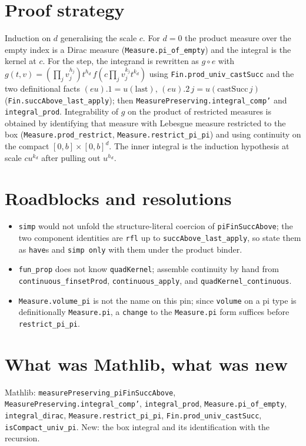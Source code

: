 \documentclass[11pt]{article}
\begin{document}
\section{Proof strategy}
Induction on $d$ generalising the scale $c$. For $d=0$ the product measure over the empty index is a
Dirac measure (\texttt{Measure.pi\_of\_empty}) and the integral is the kernel at $c$. For the step,
the integrand is rewritten as $g\circ e$ with $g(t,v)=(\prod_jv_j^{h_j})t^{h_d}\,f(c\prod_jv_j^{k_j}t^{k_d})$
using \texttt{Fin.prod\_univ\_castSucc} and the two definitional facts $(eu).1=u(\mathrm{last})$,
$(eu).2\,j=u(\mathrm{castSucc}\,j)$ (\texttt{Fin.succAbove\_last\_apply}); then
\texttt{MeasurePreserving.integral\_comp'} and \texttt{integral\_prod}. Integrability of $g$ on the
product of restricted measures is obtained by identifying that measure with Lebesgue measure restricted
to the box (\texttt{Measure.prod\_restrict}, \texttt{Measure.restrict\_pi\_pi}) and using continuity on
the compact $[0,b]\times[0,b]^d$. The inner integral is the induction hypothesis at scale $cu^{k_d}$
after pulling out $u^{h_d}$.

\section{Roadblocks and resolutions}
\begin{itemize}
\item \texttt{simp} would not unfold the structure-literal coercion of \texttt{piFinSuccAbove}; the
two component identities are \texttt{rfl} up to \texttt{succAbove\_last\_apply}, so state them as
\texttt{have}s and \texttt{simp only} with them under the product binder.
\item \texttt{fun\_prop} does not know \texttt{quadKernel}; assemble continuity by hand from
\texttt{continuous\_finsetProd}, \texttt{continuous\_apply}, and \texttt{quadKernel\_continuous}.
\item \texttt{Measure.volume\_pi} is not the name on this pin; since \texttt{volume} on a pi type is
definitionally \texttt{Measure.pi}, a \texttt{change} to the \texttt{Measure.pi} form suffices before
\texttt{restrict\_pi\_pi}.
\end{itemize}

\section{What was Mathlib, what was new}
Mathlib: \texttt{measurePreserving\_piFinSuccAbove}, \texttt{MeasurePreserving.integral\_comp'},
\texttt{integral\_prod}, \texttt{Measure.pi\_of\_empty}, \texttt{integral\_dirac},
\texttt{Measure.restrict\_pi\_pi}, \texttt{Fin.prod\_univ\_castSucc}, \texttt{isCompact\_univ\_pi}. New:
the box integral and its identification with the recursion.
\end{document}
